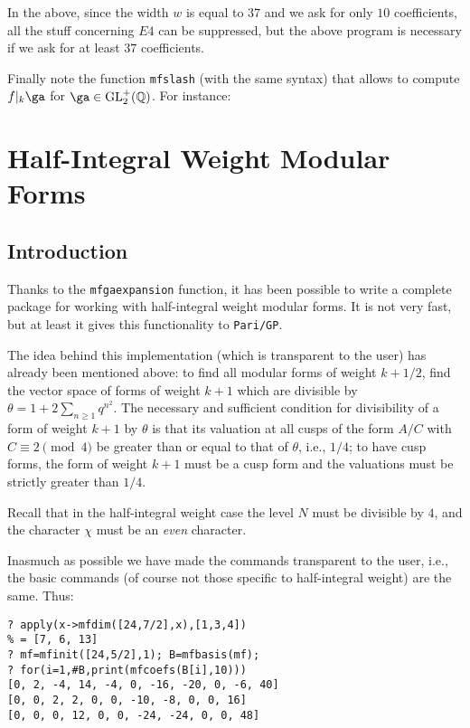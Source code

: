 \documentclass[11pt]{article}
\DeclareMathOperator{\GL}{GL}
\newcommand{\Q}{{\mathbb Q}}
\renewcommand{\th}{\theta}
\def\kbd#1{{\tt #1}}
\begin{document}
In the above, since the width $w$ is equal to $37$ and we ask for only
$10$ coefficients, all the stuff concerning $E4$ can be suppressed, but
the above program is necessary if we ask for at least $37$ coefficients.

\medskip

Finally note the function \kbd{mfslash} (with the same syntax) that allows
to compute $f|_k\ga$ for $\ga\in\GL_2^+(\Q)$. For instance:

\section{Half-Integral Weight Modular Forms}

\subsection{Introduction}

Thanks to the \kbd{mfgaexpansion} function, it has been possible to write
a complete package for working with half-integral weight modular forms.
It is not very fast, but at least it gives this functionality to
\kbd{Pari/GP}.

The idea behind this implementation (which is transparent to the user)
has already been mentioned above: to find all modular forms of weight
$k+1/2$, find the vector space of forms of weight $k+1$ which are divisible
by $\th=1+2\sum_{n\ge1}q^{n^2}$. The necessary and sufficient condition for
divisibility of a form of weight $k+1$ by $\th$ is that its valuation
at all cusps of the form $A/C$ with $C\equiv2\pmod{4}$ be greater than or
equal to that of $\theta$, i.e., $1/4$; to have cusp forms, the form of
weight $k+1$ must be a cusp form and the valuations must be strictly
greater than $1/4$.

Recall that in the half-integral weight case the level $N$ must be
divisible by $4$, and the character $\chi$ must be an \emph{even}
character.

Inasmuch as possible we have made the commands transparent to the user, i.e.,
the basic commands (of course not those specific to half-integral weight)
are the same. Thus:

\begin{verbatim}
? apply(x->mfdim([24,7/2],x),[1,3,4])
% = [7, 6, 13]
? mf=mfinit([24,5/2],1); B=mfbasis(mf);
? for(i=1,#B,print(mfcoefs(B[i],10)))
[0, 2, -4, 14, -4, 0, -16, -20, 0, -6, 40]
[0, 0, 2, 2, 0, 0, -10, -8, 0, 0, 16]
[0, 0, 0, 12, 0, 0, -24, -24, 0, 0, 48]
\end{verbatim}
\end{document}
